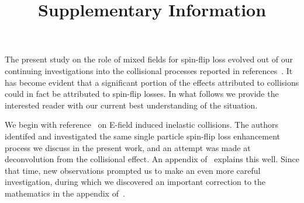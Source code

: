 \documentclass[%
 reprint,
 amsmath,amssymb,
 aps,
prl,
]{revtex4-1}
\begin{document}

\title{Supplementary Information}%







\maketitle



The present study on the role of mixed fields for spin-flip loss evolved out of our continuing investigations into the collisional processes reported in references~\cite{Stuhl2012evap,Stuhl2013}.
It has become evident that a significant portion of the effects attributed to collisions could in fact be attributed to spin-flip losses.
In what follows we provide the interested reader with our current best understanding of the situation.

We begin with reference~\cite{Stuhl2013} on E-field induced inelastic collisions. 
The authors identifed and investigated the same single particle spin-flip loss enhancement process we discuss in the present work, and an attempt was made at deconvolution from the collisional effect. 
An appendix of~\cite{Stuhl2013} explains this well.
Since that time, new observations prompted us to make an even more careful investigation, during which we discovered an important correction to the mathematics in the appendix of~\cite{Stuhl2013}.
\end{document}
